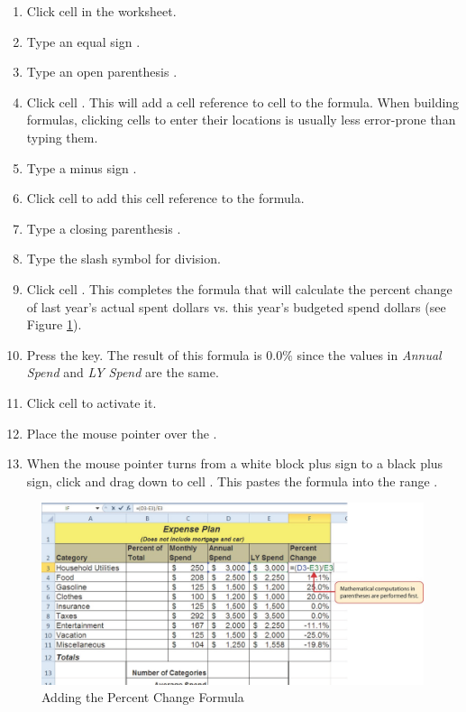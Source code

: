 \begin{enumerate}
	\item Click cell  in the  worksheet.
	\item Type an equal sign \fmtTyping{=}.
	\item Type an open parenthesis \fmtTyping{(}.
	\item Click cell . This will add a cell reference to cell  to the formula. When building formulas, clicking cells to enter their locations is usually less error-prone than typing them.
	\item Type a minus sign \fmtTyping{-}.
	\item Click cell  to add this cell reference to the formula.
	\item Type a closing parenthesis \fmtTyping{)}.
	\item Type the slash \fmtTyping{/} symbol for division.
	\item Click cell . This completes the formula that will calculate the percent change of last year's actual spent dollars vs. this year's budgeted spend dollars (see Figure \ref{02:fig06}).
	\item Press the  key. The result of this formula is $ 0.0\% $ since the values in \textit{Annual Spend} and \textit{LY Spend} are the same.
	\item Click cell  to activate it.
	\item Place the mouse pointer over the .
	\item When the mouse pointer turns from a white block plus sign to a black plus sign, click and drag down to cell . This pastes the formula into the range .
\end{enumerate}

\begin{figure}[H]
	\centering
	\includegraphics[width=\maxwidth{.95\linewidth}]{gfx/ch02_fig06}
	\caption{Adding the Percent Change Formula}
	\label{02:fig06}
\end{figure}

